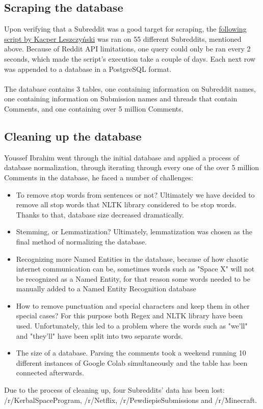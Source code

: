 \documentclass[openany]{article}
\begin{document}
\subsection{Scraping the database}
Upon verifying that a Subreddit was a good target for scraping, the \href{https://github.com/scrapingredditboys/ScrapingRedditNaturalLanguageProcessingWUT2019/tree/master/reddit-collector}{following script by Kacper Leszczyński} was ran on 55 different Subreddits, mentioned above. Because of Reddit API limitations, one query could only be ran every 2 seconds, which made the script's execution take a couple of days. Each next row was appended to a database in a PostgreSQL format.\\ \\
The database contains 3 tables, one containing information on Subreddit names, one containing information on Submission names and threads that contain Comments, and one containing over 5 million Comments.

\subsection{Cleaning up the database}
Youssef Ibrahim went through the initial database and applied a process of database normalization, through iterating through every one of the over 5 million Comments in the database, he faced a number of challenges:
\begin{itemize}
    \item To remove stop words from sentences or not? Ultimately we have decided to remove all stop words that NLTK library considered to be stop words\cite{stopwords}. Thanks to that, database size decreased dramatically.
    \item Stemming, or Lemmatization? Ultimately, lemmatization was chosen as the final method of normalizing the database.
    \item Recognizing more Named Entities in the database, because of how chaotic internet communication can be, sometimes words such as "Space X" will not be recognized as a Named Entity, for that reason some words needed to be manually added to a Named Entity Recognition database
    \item How to remove punctuation and special characters and keep them in other special cases? For this purpose both Regex and NLTK library have been used. Unfortunately, this led to a problem where the words such as "we'll" and "they'll" have been split into two separate words.
    \item The size of a database. Parsing the comments took a weekend running 10 different instances of Google Colab simultaneously and the table has been connected afterwards.
\end{itemize}
Due to the process of cleaning up, four Subreddits' data has been lost: /r/KerbalSpaceProgram, /r/Netflix, /r/PewdiepieSubmissions and /r/Minecraft.
\end{document}
